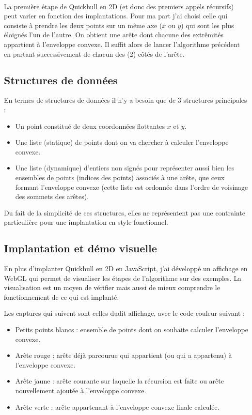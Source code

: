 \documentclass[]{article}
\begin{document}
\paragraph{}
La première étape de Quickhull en 2D (et donc des premiers appels récursifs) peut varier en fonction des implantations. Pour ma part j'ai choisi celle qui consiste à prendre les deux points sur un même axe ($x$ ou $y$) qui sont les plus éloignés l'un de l'autre. On obtient une arête dont chacune des extrêmités appartient à l'enveloppe convexe. Il suffit alors de lancer l'algorithme précédent en partant successivement de chacun des (2) côtés de l'arête.

\subsection{Structures de données}
En termes de structures de données il n'y a besoin que de 3 structures principales :
\begin{itemize}
	\item Un point constitué de deux coordonnées flottantes $x$ et $y$.
	\item Une liste (statique) de points dont on va chercher à calculer l'enveloppe convexe.
	\item Une liste (dynamique) d'entiers non signés pour représenter aussi bien les ensembles de points (indices des points) associés à une arête, que ceux formant l'enveloppe convexe (cette liste est ordonnée dans l'ordre de voisinage des sommets des arêtes).
\end{itemize}

Du fait de la simplicité de ces structures, elles ne représentent pas une contrainte particulière pour une implantation en style fonctionnel.

\subsection{Implantation et démo visuelle}
En plus d'implanter Quickhull en 2D en JavaScript, j'ai développé un affichage en WebGL qui permet de visualiser les étapes de l'algorithme sur des exemples. La visualisation est un moyen de vérifier mais aussi de mieux comprendre le fonctionnement de ce qui est implanté.

Les captures qui suivent sont celles dudit affichage, avec le code couleur suivant :
\begin{itemize}
	\item Petits points blancs : ensemble de points dont on souhaite calculer l'enveloppe convexe.
	\item Arête rouge : arête déjà parcourue qui appartient (ou qui a appartenu) à l'enveloppe convexe.
	\item Arête jaune : arête courante sur laquelle la récursion est faite ou arête nouvellement ajoutée à l'enveloppe convexe.
	\item Arête verte : arête appartenant à l'enveloppe convexe finale calculée.
\end{itemize}
\end{document}
